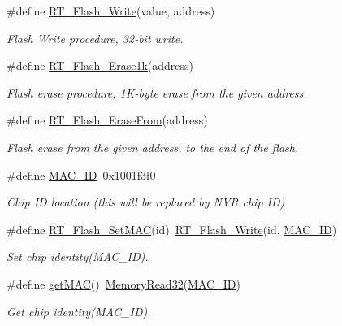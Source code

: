 \begin{DoxyCompactItemize}
\item 
\#define \mbox{\hyperlink{a00008_a13fb43316f72b3b1b9467a91fca08d5c}{R\+T\+\_\+\+Flash\+\_\+\+Write}}(value,  address)
\begin{DoxyCompactList}\small\item\em Flash Write procedure, 32-\/bit write. \end{DoxyCompactList}\item 
\#define \mbox{\hyperlink{a00008_ab65db3c66c91da3a934540a2f8175803}{R\+T\+\_\+\+Flash\+\_\+\+Erase1k}}(address)
\begin{DoxyCompactList}\small\item\em Flash erase procedure, 1\+K-\/byte erase from the given address. \end{DoxyCompactList}\item 
\#define \mbox{\hyperlink{a00008_afb9cdf54d7254cfef685cd4012113b27}{R\+T\+\_\+\+Flash\+\_\+\+Erase\+From}}(address)
\begin{DoxyCompactList}\small\item\em Flash erase from the given address, to the end of the flash. \end{DoxyCompactList}\item 
\#define \mbox{\hyperlink{a00008_aca69c626499ce2e479703cc526dba84d}{M\+A\+C\+\_\+\+ID}}~0x1001f3f0
\begin{DoxyCompactList}\small\item\em Chip ID location (this will be replaced by N\+VR chip ID) \end{DoxyCompactList}\item 
\mbox{\label{a00008_a99ec94a33a9126a436139061d9e0136b}} 
\#define \mbox{\hyperlink{a00008_a99ec94a33a9126a436139061d9e0136b}{R\+T\+\_\+\+Flash\+\_\+\+Set\+M\+AC}}(id)~\mbox{\hyperlink{a00008_a13fb43316f72b3b1b9467a91fca08d5c}{R\+T\+\_\+\+Flash\+\_\+\+Write}}(id, \mbox{\hyperlink{a00008_aca69c626499ce2e479703cc526dba84d}{M\+A\+C\+\_\+\+ID}})
\begin{DoxyCompactList}\small\item\em Set chip identity(\+M\+A\+C\+\_\+\+I\+D). \end{DoxyCompactList}\item 
\mbox{\label{a00008_ad271967795fc89594428deff626aace9}} 
\#define \mbox{\hyperlink{a00008_ad271967795fc89594428deff626aace9}{get\+M\+AC}}()~\mbox{\hyperlink{a00020_a706b02571285f92589fbb0b964d7d0bb}{Memory\+Read32}}(\mbox{\hyperlink{a00008_aca69c626499ce2e479703cc526dba84d}{M\+A\+C\+\_\+\+ID}})
\begin{DoxyCompactList}\small\item\em Get chip identity(\+M\+A\+C\+\_\+\+I\+D). \end{DoxyCompactList}\end{DoxyCompactItemize}


